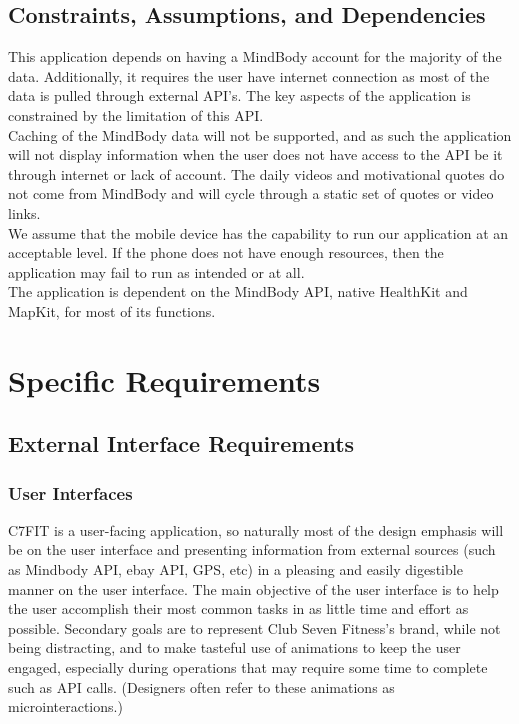 \documentclass[letterpaper,10pt,titlepage]{article}
\begin{document}
\subsection{Constraints, Assumptions, and Dependencies}

This application depends on having a MindBody account for the majority of the data. Additionally, it requires the user have internet connection as most of the data is pulled through external API’s. The key aspects of the application is constrained by the limitation of this API.\\

Caching of the MindBody data will not be supported, and as such the application will not display information when the user does not have access to the API be it through internet or lack of account. The daily videos and motivational quotes do not come from MindBody and will cycle through a static set of quotes or video links.\\

We assume that the mobile device has the capability to run our application at an acceptable level. If the phone does not have enough resources, then the application may fail to run as intended or at all.\\

The application is dependent on the MindBody API, native HealthKit and MapKit, for most of its functions.\\

\section{Specific Requirements}

\subsection{External Interface Requirements}

\subsubsection{User Interfaces}

C7FIT is a user-facing application, so naturally most of the design emphasis will be on the user interface and presenting information from external sources (such as Mindbody API, ebay API, GPS, etc) in a pleasing and easily digestible manner on the user interface. The main objective of the user interface is to help the user accomplish their most common tasks in as little time and effort as possible. Secondary goals are to represent Club Seven Fitness’s brand, while not being distracting, and to make tasteful use of animations to keep the user engaged, especially during operations that may require some time to complete such as API calls. (Designers often refer to these animations as microinteractions.)\\
\end{document}
